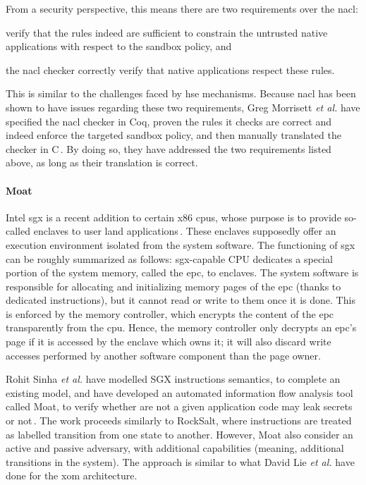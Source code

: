 From a security perspective, this means there are two requirements over the
\ac{nacl}:
%
\begin{inparaenum}[(1)]
\item verify that the rules indeed are sufficient to constrain the untrusted
  native applications with respect to the sandbox policy, and
%
\item the \ac{nacl} checker correctly verify that native applications respect
  these rules.
\end{inparaenum}
%
This is similar to the challenges faced by \ac{hse} mechanisms.
%
Because \ac{nacl} has been shown to have issues regarding these two
requirements, Greg Morrisett \emph{et al.} have specified the \ac{nacl} checker
in Coq, proven the rules it checks are correct and indeed enforce the targeted
sandbox policy, and then manually translated the checker in
C\,\cite{morrisett2012rocksalt}.
%
By doing so, they have addressed the two requirements listed above, as long as
their translation is correct.

\paragraph{Moat}
%
Intel \ac{sgx} is a recent addition to certain x86 \acp{cpu}, whose purpose is
to provide so-called enclaves to user land
applications\,\cite{costan2016sgxexplained}.
%
These enclaves supposedly offer an execution environment isolated from the
system software.
%
The functioning of \ac{sgx} can be roughly summarized as follows:
\ac{sgx}-capable CPU dedicates a special portion of the system memory, called
the \ac{epc}, to enclaves.
%
The system software is responsible for allocating and initializing memory pages
of the \ac{epc} (thanks to dedicated instructions), but it cannot read or write
to them once it is done.
%
This is enforced by the memory controller, which encrypts the content of the
\ac{epc} transparently from the \ac{cpu}.
%
Hence, the memory controller only decrypts an \ac{epc}'s page if it is accessed
by the enclave which owns it; it will also discard write accesses performed by
another software component than the page owner.

Rohit Sinha \emph{et al.} have modelled SGX instructions semantics, to complete
an existing model, and have developed an automated information flow analysis
tool called Moat, to verify whether are not a given application code may leak
secrets or not\,\cite{sinha2015moat}.
%
The work proceeds similarly to RockSalt, where instructions are treated as
labelled transition from one state to another.
%
However, Moat also consider an active and passive adversary, with additional
capabilities (meaning, additional transitions in the system).
%
The approach is similar to what David Lie \emph{et al.} have done for the
\ac{xom} architecture.


